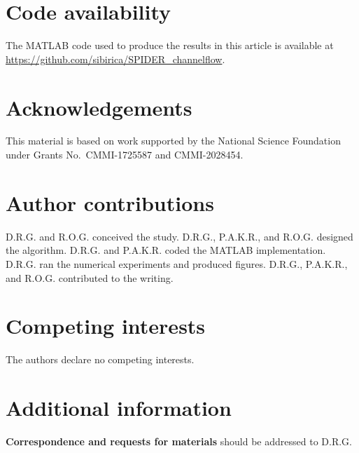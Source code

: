 \documentclass[
 reprint,
 amsmath,amssymb,
 aps,
]{revtex4-2}
\begin{document}
\section*{Code availability}
The MATLAB code used to produce the results in this article is available at \url{https://github.com/sibirica/SPIDER_channelflow}.  


%

\section*{Acknowledgements}
This material is based on work supported by the National Science Foundation under Grants No.~CMMI-1725587 and CMMI-2028454.

\section*{Author contributions}
D.R.G. and R.O.G. conceived the study. D.R.G., P.A.K.R., and R.O.G. designed the algorithm. D.R.G. and P.A.K.R. coded the MATLAB implementation. D.R.G. ran the numerical experiments and produced figures. D.R.G., P.A.K.R., and R.O.G. contributed to the writing.

\section*{Competing interests}
The authors declare no competing interests.

\section*{Additional information}
{\bf Correspondence and requests for materials} should be addressed to D.R.G.

\end{document}
